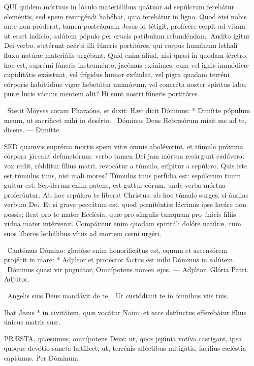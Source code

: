 \lettrine[lines=2]{Q}{UI} quidem mórtuus in lóculo materiálibus quátuor ad sepúlcrum ferebátur eleméntis, sed spem resurgéndi habébat, quia ferebátur in ligno. Quod etsi nobis ante non próderat, tamen posteáquam Jesus id tétigit, profícere cœpit ad vitam: ut esset indício, salútem pópulo per crucis patíbulum refundéndam. Audíto ígitur Dei verbo, stetérunt acérbi illi fúneris portitóres, qui corpus humánum lethali fluxu natúræ materiális urgébant. Quid enim áliud, nisi quasi in quodam féretro, hoc est, suprémi fúneris instruménto, jacémus exánimes, cum vel ignis immódicæ cupiditátis exǽstuat, vel frígidus humor exúndat, vel pigra quadam terréni córporis habitúdine vigor hebetátur animórum, vel concréta noster spíritus labe, puræ lucis vácuus mentem alit? Hi sunt nostri fúneris portitóres.

\R\ Stetit Móyses coram Pharaóne, et dixit: Hæc dicit Dóminus: * Dimítte pópulum meum, ut sacríficet mihi in desérto. \V\ Dóminus Deus Hebræórum misit me ad te, dicens. --- Dimítte.


\lettrine[lines=2]{S}{ED} quamvis supréma mortis spem vitæ omnis aboléverint, et túmulo próxima córpora jáceant defunctórum: verbo tamen Dei jam mórtua resúrgunt cadávera: vox redit, rédditur fílius matri, revocátur a túmulo, erípitur a sepúlcro. Quis iste est túmulus tuus, nisi mali mores? Túmulus tuus perfídia est: sepúlcrum tuum guttur est. Sepúlcrum enim patens, est guttur eórum, unde verba mórtua proferúntur. Ab hoc sepúlcro te líberat Christus: ab hoc túmulo surges, si áudias verbum Dei. Et si grave peccátum est, quod pœniténtiæ lácrimis ipse laváre non possis; fleat pro te mater Ecclésia, quæ pro síngulis tamquam pro únicis fíliis vídua mater intérvenit. Compátitur enim quodam spiritáli dolóre natúræ, cum suos líberos lethálibus vítiis ad mortem cerni urgéri.

\R\ Cantémus Dómino: glorióse enim honorificátus est, equum et ascensórem projécit in mare: * Adjútor et protéctor factus est mihi Dóminus in salútem. \V\ Dóminus quasi vir pugnátor, Omnípotens nomen ejus. --- Adjútor. Glória Patri. Adjútor.

\V\ Angelis suis Deus mandávit de te. \R\ Ut custódiant te in ómnibus viis tuis.

 Ibat Jesus * in civitátem, quæ vocátur Naim: et ecce defúnctus efferebátur fílius únicus matris suæ.


\lettrine[lines=2]{P}{RÆSTA}, quæsumus, omnípotens Deus: ut, quos jejúnia votíva castígant, ipsa quoque devótio sancta lætíficet; ut, terrénis afféctibus mitigátis, facílius cæléstia capiámus. Per Dóminum.


